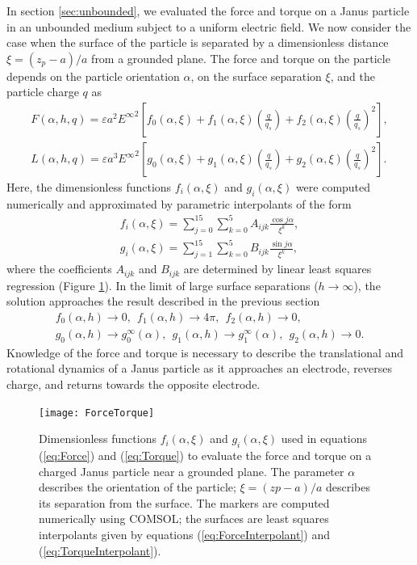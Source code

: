 \begin{appendices}
In section \ref{sec:unbounded}, we evaluated the force and torque on a Janus particle in an unbounded medium subject to a uniform electric field.  We now consider the case when the surface of the particle is separated by a dimensionless distance $\xi=(z_p-a) / a$ from a grounded plane.  The force and torque on the particle depends on the particle orientation $\alpha$, on the surface separation $\xi$, and the particle charge $q$ as
\begin{gather}
    F(\alpha,h,q) = \varepsilon a^2 {E^{\infty}}^2 \left[f_0(\alpha,\xi) + f_1(\alpha,\xi) \left(\frac{q}{q_s}\right)  + f_2(\alpha,\xi)\left(\frac{q}{q_s}\right)^2 \right], \label{eq:Force}
    \\
    L(\alpha,h,q) = \varepsilon a^3 {E^{\infty}}^2 \left[g_0(\alpha,\xi) + g_1(\alpha,\xi) \left(\frac{q}{q_s}\right)  + g_2(\alpha,\xi)\left(\frac{q}{q_s}\right)^2 \right].\label{eq:Torque}
\end{gather}
Here, the dimensionless functions $f_i(\alpha,\xi)$ and $g_i(\alpha,\xi)$ were computed numerically and approximated by parametric interpolants of the form
\begin{gather}
    f_i(\alpha,\xi) = \sum_{j=0}^{15}\sum_{k=0}^5 A_{ijk} \frac{\cos j\alpha}{\xi^k},\label{eq:ForceInterpolant}
    \\
    g_i(\alpha,\xi) = \sum_{j=1}^{15}\sum_{k=0}^5 B_{ijk} \frac{\sin j\alpha}{\xi^k},\label{eq:TorqueInterpolant}
\end{gather}
where the coefficients $A_{ijk}$ and $B_{ijk}$ are determined by linear least squares regression (Figure \ref{fig:ForceTorque}). In the limit of large surface separations ($h\rightarrow\infty$), the solution approaches the result described in the previous section 
\begin{gather}
    f_0(\alpha,h)\rightarrow0,~~ f_1(\alpha,h)\rightarrow4\pi,~~ f_2(\alpha,h)\rightarrow0,
    \\
    g_0(\alpha,h)\rightarrow g_0^{\infty}(\alpha),~~ g_1(\alpha,h)\rightarrow g_1^{\infty}(\alpha),~~ g_2(\alpha,h)\rightarrow0.
\end{gather}
Knowledge of the force and torque is necessary to describe the translational and rotational dynamics of a Janus particle as it approaches an electrode, reverses charge, and returns towards the opposite electrode.

\begin{figure}
    \centering
    \texttt{[image: ForceTorque]}
    \caption{Dimensionless functions $f_i(\alpha,\xi)$ and $g_i(\alpha,\xi)$ used in equations (\ref{eq:Force}) and (\ref{eq:Torque}) to evaluate the force and torque on a charged Janus particle near a grounded plane. The parameter $\alpha$ describes the orientation of the particle; $\xi=(zp-a)/a$ describes its separation from the surface. The markers are computed numerically using COMSOL; the surfaces are least squares interpolants given by equations (\ref{eq:ForceInterpolant}) and (\ref{eq:TorqueInterpolant}).}
    \label{fig:ForceTorque}
\end{figure}



\end{appendices}
